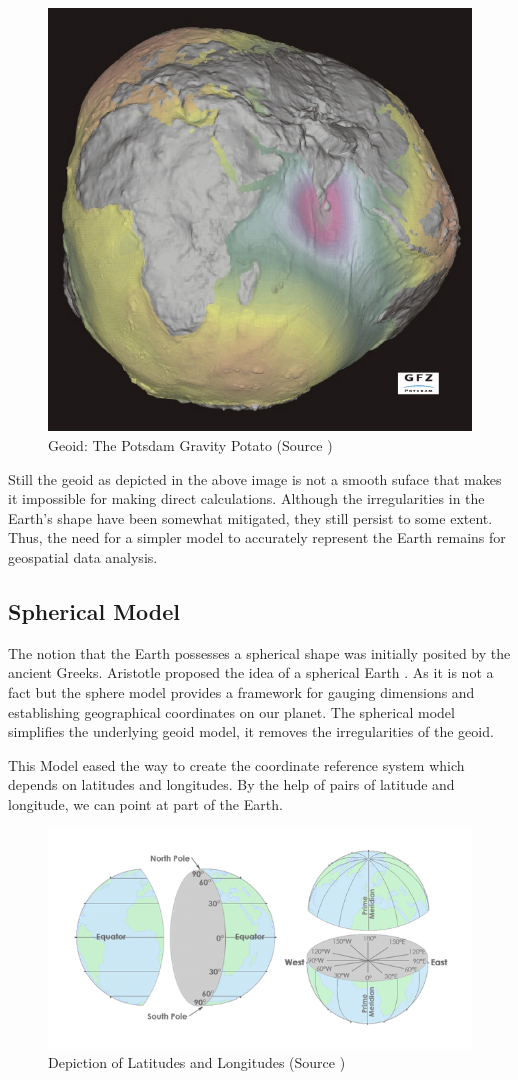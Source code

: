 \begin{figure}[h]
    \centering
    \includegraphics[width=0.7\linewidth]{figures/chapter-2/geoid.jpg}
    \caption{Geoid: The Potsdam Gravity Potato (Source \cite{GEOID_IMAGE}) }
    \label{fig:geoid-image}
\end{figure}

Still the geoid as depicted in the above image is not a smooth suface that makes it impossible for making direct calculations. Although the irregularities in the Earth's shape have been somewhat mitigated, they still persist to some extent. Thus, the need for a simpler model to accurately represent the Earth remains for geospatial data analysis.


\subsection{Spherical Model}

The notion that the Earth possesses a spherical shape was initially posited by the ancient Greeks. Aristotle proposed the idea of a spherical Earth \cite{Johns1959-og}.
As it is not a fact but the sphere model provides a framework for gauging dimensions and establishing geographical coordinates on our planet. The spherical model simplifies the underlying geoid model,
it removes the irregularities of the geoid.

This Model eased the way to create the coordinate reference system which depends on latitudes and longitudes. By the help of pairs of latitude and longitude, we can point at part of the Earth.

\begin{figure}[h]
    \centering
    \includegraphics[width=0.7\linewidth]{figures/chapter-2/lat_lon.png}
    \caption{Depiction of Latitudes and Longitudes (Source \cite{GISGEO_LatLon}) }
    \label{fig:shpere-image}
\end{figure}

